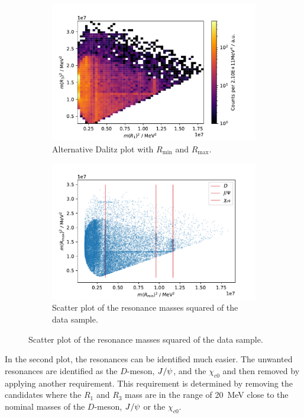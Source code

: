 \begin{figure}[H]
	\centering
	\begin{subfigure}{0.45\textwidth}
		\includegraphics[width=\textwidth]{content/pictures/image_fin/DalitzMINMAXDataHist.pdf}
		\caption{Alternative Dalitz plot with $R_\mathrm{min}$ and $R_\mathrm{max}$.}
		\label{fig:dalitzalt}
	\end{subfigure}
	\begin{subfigure}{0.45\textwidth}
		\includegraphics[width=\textwidth]{content/pictures/image_fin/DalitzData}
		\caption{Scatter plot of the resonance masses squared of the data sample.}
		\label{fig:dalitzdata}
	\end{subfigure} 
\end{figure}

In the second plot, the resonances can be identified much easier. 
The unwanted resonances are identified as the $D$-meson, $J\-/\-\psi$, 
and the $\chi_{c0}$ and then removed by applying another requirement. 
This requirement is determined by removing the candidates where the $R_1$ 
and $R_3$ mass are in the range of \qty{20}{\mega\eV} close to the nominal 
masses of the $D$-meson, $J\-/\-\psi$ or the $\chi_{c0}$.\\

